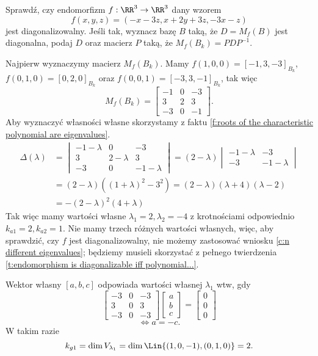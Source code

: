 \begin{example}
    Sprawdź, czy endomorfizm $f : \RR^3 \to \RR^3$ dany wzorem
    \[ f(x, y, z) = (-x-3z, x + 2y + 3z, -3x - z) \]
    jest diagonalizowalny. Jeśli tak, wyznacz bazę $B$ taką, że $D = M_f(B)$ jest diagonalna, podaj $D$ oraz macierz $P$ taką, że $M_f(B_k) = PDP^{-1}$.
\end{example}
\begin{solution}
    Najpierw wyznaczymy macierz $M_f(B_k)$. Mamy $f(1, 0, 0) = [-1, 3, -3]_{B_k}$, $f(0, 1, 0) = [0, 2, 0]_{B_k}$ oraz $f(0, 0, 1) = [-3, 3, -1]_{B_k}$, tak więc
    \[ M_f(B_k) = \begin{bmatrix}
        -1 & 0 & -3 \\
        3 & 2 & 3 \\
        -3 & 0 & -1
    \end{bmatrix}. \]
    Aby wyznaczyć własności własne skorzystamy z faktu \ref{f:roots of the characteristic polynomial are eigenvalues}.
    \begin{align*} \Delta(\lambda) &=
        \begin{vmatrix}
            -1 - \lambda & 0 & -3 \\
            3 & 2 - \lambda & 3 \\
            -3 & 0 & -1 - \lambda
        \end{vmatrix} = (2 - \lambda) \begin{vmatrix}
            -1 - \lambda & -3 \\
            -3 & -1 - \lambda
        \end{vmatrix} \\
        &= (2 - \lambda)((1 + \lambda)^2 - 3^2) = (2 - \lambda)(\lambda + 4)(\lambda - 2) \\
        &= -(2 - \lambda)^2(4 + \lambda)
    \end{align*}
    Tak więc mamy wartości własne $\lambda_1 = 2, \lambda_2 = -4$ z krotnościami odpowiednio $k_{a1} = 2, k_{a2} = 1$. Nie mamy trzech różnych wartości własnych, więc, aby sprawdzić, czy $f$ jest diagonalizowalny, nie możemy zastosować wniosku \ref{c:n different eigenvalues}; będziemy musieli skorzystać z pełnego twierdzenia \ref{t:endomorphism is diagonalizable iff polynomial...}.

    Wektor własny $[a, b, c]$ odpowiada wartości własnej $\lambda_1$ wtw, gdy
    \[ \begin{bmatrix}
        -3 & 0 & -3 \\
        3 & 0 & 3 \\
        -3 & 0 & -3
    \end{bmatrix}\begin{bmatrix}
        a \\ b \\ c
    \end{bmatrix} = \begin{bmatrix}
        0 \\ 0 \\ 0
    \end{bmatrix} \]
    \[ \iff a = -c. \]
    W takim razie
    \[ k_{g1} = \dim V_{\lambda_1} = \dim\Lin\{(1, 0, -1), (0, 1, 0)\} = 2. \]


\end{solution}
